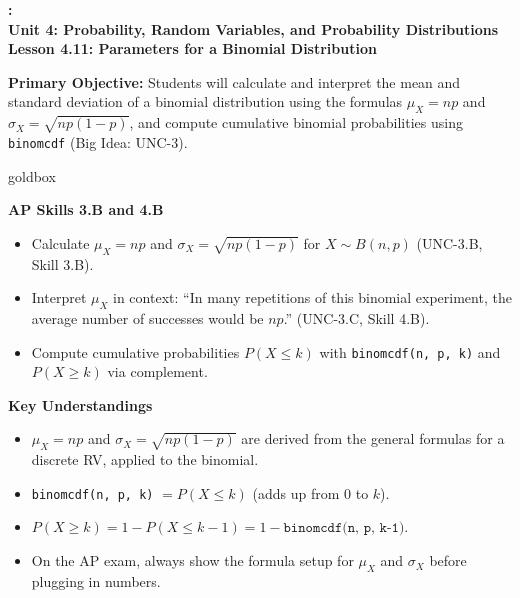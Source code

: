 \documentclass[10pt]{article}
\newcommand{\UnitNumberName}{Unit 4: Probability, Random Variables, and Probability Distributions \quad}
\newcommand{\LessonNumberName}{Lesson 4.11: Parameters for a Binomial Distribution}
\begin{document}
\begin{center}
    {\Large\bfseries \CourseName: \SchoolYear \\
    {\small\bfseries \UnitNumberName \LessonNumberName}}
\end{center}

\begin{tcolorbox}[colback=sky, colframe=navy, boxrule=0.9pt, arc=2mm,
    left=2mm, right=2mm, top=1.5mm, bottom=1.5mm]
    \textbf{Primary Objective:} Students will calculate and interpret the mean and
    standard deviation of a binomial distribution using the formulas $\mu_X = np$
    and $\sigma_X = \sqrt{np(1-p)}$, and compute cumulative binomial probabilities
    using \texttt{binomcdf} (Big Idea: UNC-3).
\end{tcolorbox}

\renewcommand{\arraystretch}{1.6}
\begin{skillbox}{goldbox}
\begin{minipage}[t]{0.48\linewidth}
    \textbf{AP Skills 3.B and 4.B}
    \begin{itemize}
        \item Calculate $\mu_X = np$ and $\sigma_X = \sqrt{np(1-p)}$ for
              $X \sim B(n, p)$ (UNC-3.B, Skill 3.B).
        \item Interpret $\mu_X$ in context: ``In many repetitions of this
              binomial experiment, the average number of successes would be
              $np$.'' (UNC-3.C, Skill 4.B).
        \item Compute cumulative probabilities $P(X \le k)$ with
              \texttt{binomcdf(n, p, k)} and $P(X \ge k)$ via complement.
    \end{itemize}
\end{minipage}
\hfill
\begin{minipage}[t]{0.48\linewidth}
    \textbf{Key Understandings}
    \begin{itemize}
        \item $\mu_X = np$ and $\sigma_X = \sqrt{np(1-p)}$ are derived from the
              general formulas for a discrete RV, applied to the binomial.
        \item \texttt{binomcdf(n, p, k)} $= P(X \le k)$ (adds up from $0$ to $k$).
        \item $P(X \ge k) = 1 - P(X \le k-1) = 1 - \texttt{binomcdf(n, p, k-1)}$.
        \item On the AP exam, always show the formula setup for $\mu_X$ and
              $\sigma_X$ before plugging in numbers.
    \end{itemize}
\end{minipage}
\end{skillbox}
\end{document}
